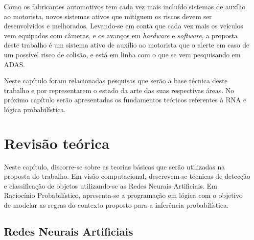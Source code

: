 \documentclass[
	12pt,				%
    oneside,			%
	a4paper,			%
	english,			%
	french,				%
	spanish,			%
	brazil,				%
	]{abntex2}
\begin{document}
Como os fabricantes automotivos tem cada vez mais incluído sistemas de auxílio ao motorista, novos sistemas ativos que mitiguem os riscos devem ser desenvolvidos e melhorados. Levando-se em conta que cada vez mais os veículos vem equipados com câmeras, e os avanços em \textit{hardware} e \textit{software}, a proposta deste trabalho é um sistema ativo de auxílio ao motorista que o alerte em caso de um possível risco de colisão, e está em linha com o que se vem pesquisando em ADAS.

Neste capítulo foram relacionadas pesquisas que serão a base técnica deste trabalho e por representarem o estado da arte das suas respectivas áreas. No próximo capítulo serão apresentadas os fundamentos teóricos referentes à RNA e lógica probabilística.








\chapter{Revisão teórica}

Neste capítulo, discorre-se sobre as teorias básicas que serão utilizadas na proposta do trabalho. Em visão computacional, descrevem-se técnicas de detecção e classificação de objetos utilizando-se as Redes Neurais Artificiais. Em Raciocínio Probabilístico, apresenta-se a programação em lógica com o objetivo de modelar as regras do contexto proposto para a inferência probabilística.

\section {Redes Neurais Artificiais}




\end{document}
